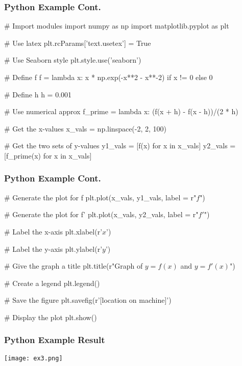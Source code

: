 \documentclass{beamer}
\begin{document}
\begin{frame}[fragile]
\frametitle{Python Example Cont.}
{
\linespread{0.8}
\tiny
\begin{verbatim*}
# Import modules 
import numpy as np
import matplotlib.pyplot as plt

# Use latex
plt.rcParams['text.usetex'] = True

# Use Seaborn style
plt.style.use('seaborn')

# Define f
f = lambda x: x * np.exp(-x**2 - x**-2) if x != 0 else 0

# Define h
h = 0.001

# Use numerical approx
f_prime = lambda x: (f(x + h) - f(x - h))/(2 * h)

# Get the x-values
x_vals = np.linspace(-2, 2, 100)

# Get the two sets of y-values
y1_vals = [f(x) for x in x_vals]
y2_vals = [f_prime(x) for x in x_vals]
\end{verbatim*}
}
\end{frame}

\begin{frame}[fragile]
\frametitle{Python Example Cont.}
{
\linespread{0.8}
\tiny
\begin{verbatim*}
# Generate the plot for f
plt.plot(x_vals, y1_vals, label = r"$f$")
         
# Generate the plot for f'
plt.plot(x_vals, y2_vals, label = r"$f'$")  
         
# Label the x-axis
plt.xlabel(r'$x$')
         
# Label the y-axis
plt.ylabel(r'$y$')
         
# Give the graph a title
plt.title(r"Graph of $y = f(x)$ and $y = f'(x)$")

# Create a legend
plt.legend()
         
# Save the figure
plt.savefig(r'[location on machine]')
         
# Display the plot
plt.show()    
\end{verbatim*}
}
\end{frame}

\begin{frame}
\frametitle{Python Example Result}
\begin{center}
\texttt{[image: ex3.png]}
\end{center}
\end{frame}
\end{document}
